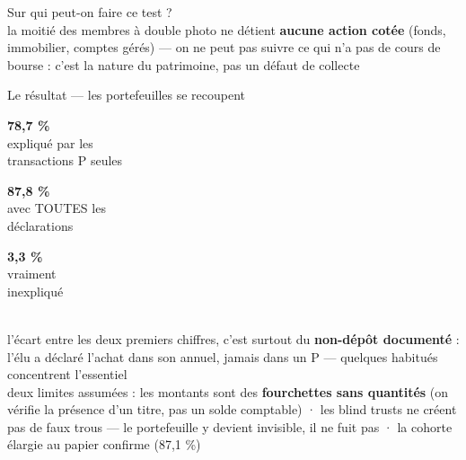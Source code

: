 \documentclass[11pt,aspectratio=169]{beamer}
\newcommand{\tuile}[3]{%
  \begin{minipage}[t]{0.23\textwidth}\centering
    \colorbox{#1}{\parbox[c][21mm][c]{\dimexpr\linewidth-8pt}{\centering
      {\color{white}\Large\textbf{#2}}\\[0.6mm]
      {\color{white}\footnotesize #3}}}
  \end{minipage}}
\begin{document}
\begin{frame}{Sur qui peut-on faire ce test ?}
  \centering
  \\[4mm]
  {\footnotesize la moitié des membres à double photo ne détient \textbf{aucune action cotée}
   (fonds, immobilier, comptes gérés) — on ne peut pas suivre ce qui n'a pas de cours de
   bourse : c'est la nature du patrimoine, pas un défaut de collecte}
\end{frame}

\begin{frame}{Le résultat — les portefeuilles se recoupent}
  \centering
  \tuile{helec}{78,7 \%}{expliqué par les\\transactions P seules}\hfill
  \tuile{okgreen}{87,8 \%}{avec TOUTES les\\déclarations}\hfill
  \tuile{alertred}{3,3 \%}{vraiment\\inexpliqué}\\[4mm]
  {\footnotesize l'écart entre les deux premiers chiffres, c'est surtout du
   \textbf{non-dépôt documenté} : l'élu a déclaré l'achat dans son annuel, jamais dans un P —
   quelques habitués concentrent l'essentiel}\\[2.5mm]
  {\scriptsize\color{black!60} deux limites assumées : les montants sont des
   \textbf{fourchettes sans quantités} (on vérifie la présence d'un titre, pas un solde
   comptable) · les blind trusts ne créent pas de faux trous — le portefeuille y devient
   invisible, il ne fuit pas · la cohorte élargie au papier confirme (87,1 \%)}
\end{frame}
\end{document}

